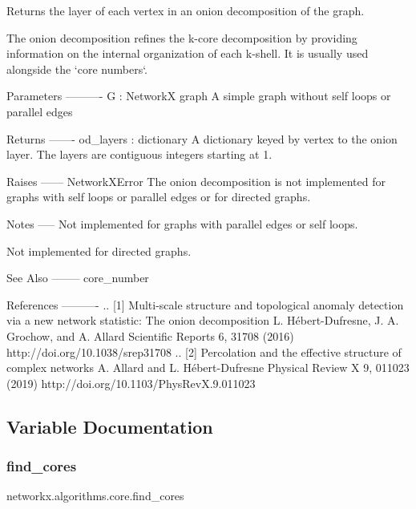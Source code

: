 \begin{DoxyVerb}Returns the layer of each vertex in an onion decomposition of the graph.

The onion decomposition refines the k-core decomposition by providing
information on the internal organization of each k-shell. It is usually
used alongside the `core numbers`.

Parameters
----------
G : NetworkX graph
    A simple graph without self loops or parallel edges

Returns
-------
od_layers : dictionary
    A dictionary keyed by vertex to the onion layer. The layers are
    contiguous integers starting at 1.

Raises
------
NetworkXError
    The onion decomposition is not implemented for graphs with self loops
    or parallel edges or for directed graphs.

Notes
-----
Not implemented for graphs with parallel edges or self loops.

Not implemented for directed graphs.

See Also
--------
core_number

References
----------
.. [1] Multi-scale structure and topological anomaly detection via a new
   network statistic: The onion decomposition
   L. Hébert-Dufresne, J. A. Grochow, and A. Allard
   Scientific Reports 6, 31708 (2016)
   http://doi.org/10.1038/srep31708
.. [2] Percolation and the effective structure of complex networks
   A. Allard and L. Hébert-Dufresne
   Physical Review X 9, 011023 (2019)
   http://doi.org/10.1103/PhysRevX.9.011023
\end{DoxyVerb}
 

\subsection{Variable Documentation}
\mbox{\label{namespacenetworkx_1_1algorithms_1_1core_a32c31accd8d2b5179eaade7e0b34743c}} 
\subsubsection{\texorpdfstring{find\+\_\+cores}{find\_cores}}
{\footnotesize\ttfamily networkx.\+algorithms.\+core.\+find\+\_\+cores}

